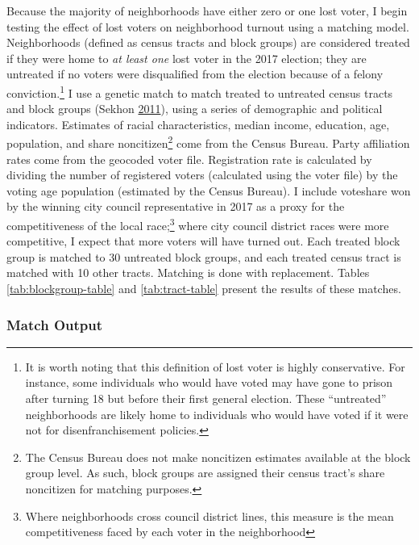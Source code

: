 \documentclass[]{article}
\let\rmarkdownfootnote\footnote%
\def\footnote{\protect\rmarkdownfootnote}
\begin{document}
Because the majority of neighborhoods have either zero or one lost voter, I begin testing the effect of lost voters on neighborhood turnout using a matching model. Neighborhoods (defined as census tracts and block groups) are considered treated if they were home to \emph{at least one} lost voter in the 2017 election; they are untreated if no voters were disqualified from the election because of a felony conviction.\footnote{It is worth noting that this definition of lost voter is highly conservative. For instance, some individuals who would have voted may have gone to prison after turning 18 but before their first general election. These ``untreated'' neighborhoods are likely home to individuals who would have voted if it were not for disenfranchisement policies.} I use a genetic match to match treated to untreated census tracts and block groups (Sekhon \protect\hyperlink{ref-Sekhon2011}{2011}), using a series of demographic and political indicators. Estimates of racial characteristics, median income, education, age, population, and share noncitizen\footnote{The Census Bureau does not make noncitizen estimates available at the block group level. As such, block groups are assigned their census tract's share noncitizen for matching purposes.} come from the Census Bureau. Party affiliation rates come from the geocoded voter file. Registration rate is calculated by dividing the number of registered voters (calculated using the voter file) by the voting age population (estimated by the Census Bureau). I include voteshare won by the winning city council representative in 2017 as a proxy for the competitiveness of the local race;\footnote{Where neighborhoods cross council district lines, this measure is the mean competitiveness faced by each voter in the neighborhood} where city council district races were more competitive, I expect that more voters will have turned out. Each treated block group is matched to 30 untreated block groups, and each treated census tract is matched with 10 other tracts. Matching is done with replacement. Tables \ref{tab:blockgroup-table} and \ref{tab:tract-table} present the results of these matches.

\hypertarget{match-output}{%
\subsubsection*{Match Output}\label{match-output}}
\end{document}
